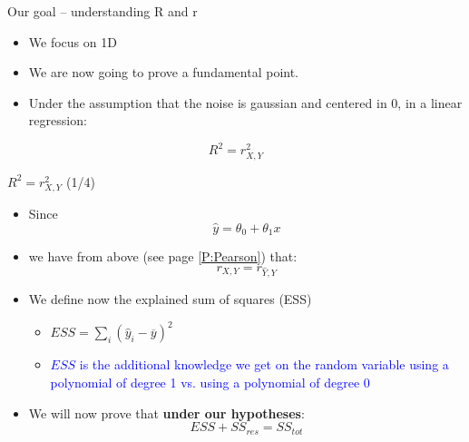 \documentclass{beamer}
\begin{document}
\begin{frame}
{\centerline{Our goal -- understanding R and r}}
\begin{itemize}
\item We focus on 1D
\item We are now going to prove a fundamental point.
\item Under the assumption that the noise is gaussian and centered in 0, in a linear regression:
\end{itemize}
$$R^2 = r_{X,Y}^2$$
\end{frame}


\begin{frame}
{\centerline{$R^2 = r_{X,Y}^2$ (1/4)}}
\begin{itemize}
\item Since
$$ \hat{y} = \theta_0 + \theta_1 x$$
\item we have from above (see page \ref{P:Pearson}) that:
$$r_{X,Y} = r_{\hat{Y},Y}$$
\item We define now the explained sum of squares (ESS) 
\begin{itemize}
\item $ ESS = \sum_i (\hat{y}_i - \overline{y})^2$
\item \textcolor{blue}{$ ESS $ is the additional knowledge we get on the random variable using a polynomial of degree 1 vs. using a polynomial of degree 0}
\end{itemize}

\item We will now prove that \textbf{under our hypotheses}:
$$ESS + SS_{res} = SS_{tot} $$
\end{itemize}
\end{frame}
\end{document}
